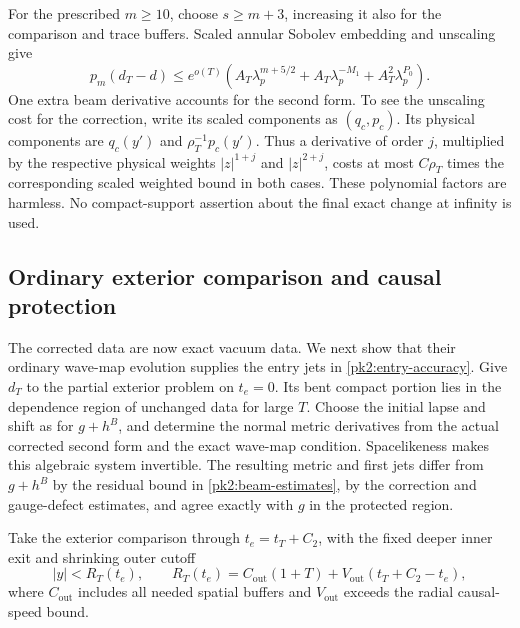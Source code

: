 For the prescribed $m\ge10$, choose $s\ge m+3$, increasing it also
for the comparison and trace buffers. Scaled annular Sobolev
embedding and unscaling give
\begin{equation}
 p_m(d_T-d)
 \le e^{o(T)}\left(
       A_T\lambda_p^{m+5/2}
       +A_T\lambda_p^{-M_1}+A_T^2\lambda_p^{P_0}\right).
 \label{pk2:data-approximation}
\end{equation}
One extra beam derivative accounts for the second form. To see the
unscaling cost for the correction, write its scaled components as
$(q_c,p_c)$. Its physical components are $q_c(y')$ and
$\rho_T^{-1}p_c(y')$. Thus a derivative of order $j$, multiplied
by the respective physical weights $|z|^{1+j}$ and $|z|^{2+j}$,
costs at most $C\rho_T$ times the corresponding scaled weighted
bound in both cases. These polynomial factors are harmless.
No compact-support assertion
about the final exact change at infinity is used.

\subsection{Ordinary exterior comparison and causal protection}
\label{pk2:exterior-comparison}

The corrected data are now exact vacuum data. We next show that their
ordinary wave-map evolution supplies the entry jets in
\eqref{pk2:entry-accuracy}. Give $d_T$ to the partial exterior problem
on $t_e=0$. Its bent compact portion lies in the dependence region
of unchanged data for large $T$. Choose the initial lapse and shift
as for $g+h^B$, and determine the normal metric derivatives from
the actual corrected second form and the exact wave-map condition.
Spacelikeness makes this algebraic system invertible. The resulting
metric and first jets differ from $g+h^B$ by the residual bound
in \eqref{pk2:beam-estimates}, by the correction and gauge-defect
estimates, and agree exactly with $g$ in the protected region.

Take the exterior comparison through $t_e=t_T+C_2$, with the fixed
deeper inner exit and shrinking outer cutoff
\begin{equation}
 |y|<R_T(t_e),\qquad
 R_T(t_e)=C_{\mathrm{out}}(1+T)
              +V_{\mathrm{out}}(t_T+C_2-t_e),
 \label{pk2:outer-cutoff}
\end{equation}
where $C_{\mathrm{out}}$ includes all needed spatial buffers and
$V_{\mathrm{out}}$ exceeds the radial causal-speed bound.

